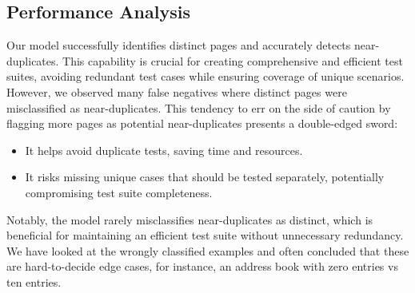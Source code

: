     \subsection{Performance Analysis}
        Our model successfully identifies distinct pages and accurately detects near-duplicates. This capability is crucial for creating comprehensive and efficient test suites, avoiding redundant test cases while ensuring coverage of unique scenarios.
        However, we observed many false negatives where distinct pages were misclassified as near-duplicates. This tendency to err on the side of caution by flagging more pages as potential near-duplicates presents a double-edged sword:
        \begin{itemize}
        \item It helps avoid duplicate tests, saving time and resources.
        \item It risks missing unique cases that should be tested separately, potentially compromising test suite completeness.
        \end{itemize}
        Notably, the model rarely misclassifies near-duplicates as distinct, which is beneficial for maintaining an efficient test suite without unnecessary redundancy. We have looked at the wrongly classified examples and often concluded that these are hard-to-decide edge cases, for instance, an address book with zero entries vs ten entries.
        
